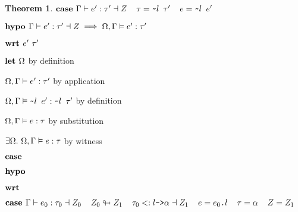 \documentclass[acmsmall]{acmart}
\theoremstyle{definition}
\newtheorem{theorem}{Theorem}[section]
\begin{document}
\begin{theorem}
  \item \Z $\textbf{case } 
    \Gamma \vdash e' : \tau' \dashv Z
    \hspace{4mm}
    \tau = \texttt{\textasciitilde{}$l$ $\tau'$}
    \hspace{4mm}
    e = \texttt{\textasciitilde{}$l$ $e'$} 
  $ 
  \item \Z $\textbf{hypo } 
      \Gamma \vdash e' : \tau' \dashv Z  
      \implies
      \Omega, \Gamma \vDash e' : \tau'
  $ 
  \item \Z $\textbf{wrt } e' \ \tau'$ 
    \item \Z\Z $\textbf{let } \Omega $ by definition
    \item \Z\Z $
      \Omega, \Gamma \vDash e' : \tau'
    $ by application
    \item \Z\Z $
      \Omega, \Gamma \vDash \texttt{\textasciitilde{}$l$ $e'$} : \texttt{\textasciitilde{}$l$ $\tau'$}
    $ by definition
    \item \Z\Z $
      \Omega, \Gamma \vDash e : \tau 
    $ by substitution
    \item \Z\Z $
      \exists \Omega .\ \Omega, \Gamma \vDash e : \tau 
    $ by witness 

  \item \Z {} 
  \item \Z $\textbf{case } $ 
  \item \Z $\textbf{hypo } $ 
  \item \Z $\textbf{wrt } $ 



  \item \Z $\textbf{case } 
    \Gamma \vdash e_0 : \tau_0 \dashv Z_0
    \hspace{4mm}
    Z_0 \looparrowright Z_1
    \hspace{4mm}
    \tau_0 <: \texttt{$l$->$\alpha$} \dashv Z_1
    \hspace{4mm}
    e = \texttt{$e_0$.$l$} \hspace{4mm} \tau = \alpha \hspace{4mm} Z = Z_1
  $
   

\end{theorem}
\end{document}
